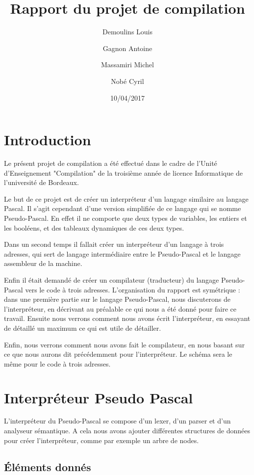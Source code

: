 \documentclass{article}
\title{Rapport du projet de compilation}
\date{10/04/2017}
\author{Demoulins Louis \and Gagnon Antoine \and Massamiri Michel \and Nobé Cyril}
\begin{document}
\maketitle
\newpage

\tableofcontents

\newpage
\section{Introduction}

Le présent projet de compilation a été effectué dans le cadre de l'Unité d'Enseignement "Compilation" de la troisième année de licence Informatique de l'université de Bordeaux.

\medbreak

Le but de ce projet est de créer un interpréteur d'un langage similaire au langage Pascal. Il s'agit cependant d'une version simplifiée de ce langage qui se nomme Pseudo-Pascal.
En effet il ne comporte que deux types de variables, les entiers et les booléens, et des tableaux dynamiques de ces deux types.

Dans un second temps il fallait créer un interpréteur d'un langage à trois adresses, qui sert de langage intermédiaire entre le Pseudo-Pascal et le langage assembleur de la machine.

Enfin il était demandé de créer un compilateur (traducteur) du langage Pseudo-Pascal vers le code à trois adresses.
\bigbreak
L'organisation du rapport est symétrique : dans une première partie sur le langage Pseudo-Pascal, nous discuterons de l'interpréteur, en décrivant au préalable ce qui nous a été donné pour faire ce travail.
Ensuite nous verrons comment nous avons écrit l'interpréteur, en essayant de détaillé un maximum ce qui est utile de détailler.

Enfin, nous verrons comment nous avons fait le compilateur, en nous basant sur ce que nous aurons dit précédemment pour l'interpréteur.
Le schéma sera le même pour le code à trois adresses.


\newpage
\section{Interpréteur Pseudo Pascal}

L'interpréteur du Pseudo-Pascal se compose d'un lexer, d'un parser et d'un analyseur sémantique. A cela nous avons ajouter différentes structures de données pour créer l'interpréteur, comme par exemple un arbre de nodes.

\subsection{Éléments donnés}
\end{document}
